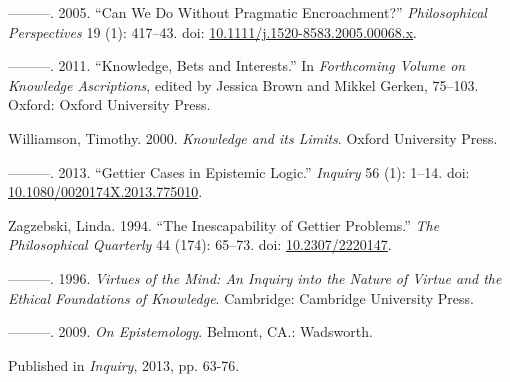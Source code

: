 \documentclass[
  10pt,
  letterpaper,
  DIV=11,
  numbers=noendperiod,
  twoside]{scrartcl}
\newlength{\cslhangindent}
\newenvironment{CSLReferences}[2] %
 {\begin{list}{}{%
  \setlength{\itemindent}{0pt}
  \setlength{\leftmargin}{0pt}
  \setlength{\parsep}{0pt}
  \ifodd #1
   \setlength{\leftmargin}{\cslhangindent}
   \setlength{\itemindent}{-1\cslhangindent}
  \fi
  \setlength{\itemsep}{#2\baselineskip}}}
 {\end{list}}
\begin{document}
\begin{CSLReferences}{1}{0}
---------. 2005. {``{Can We Do Without Pragmatic Encroachment?}''}
\emph{Philosophical Perspectives} 19 (1): 417--43. doi:
\href{https://doi.org/10.1111/j.1520-8583.2005.00068.x}{10.1111/j.1520-8583.2005.00068.x}.

---------. 2011. {``Knowledge, Bets and Interests.''} In
\emph{Forthcoming Volume on Knowledge Ascriptions}, edited by Jessica
Brown and Mikkel Gerken, 75--103. Oxford: Oxford University Press.

Williamson, Timothy. 2000. \emph{{Knowledge and its Limits}}. Oxford
University Press.

---------. 2013. {``Gettier Cases in Epistemic Logic.''} \emph{Inquiry}
56 (1): 1--14. doi:
\href{https://doi.org/10.1080/0020174X.2013.775010}{10.1080/0020174X.2013.775010}.

Zagzebski, Linda. 1994. {``The Inescapability of Gettier Problems.''}
\emph{The Philosophical Quarterly} 44 (174): 65--73. doi:
\href{https://doi.org/10.2307/2220147}{10.2307/2220147}.

---------. 1996. \emph{Virtues of the Mind: An Inquiry into the Nature
of Virtue and the Ethical Foundations of Knowledge}. Cambridge:
Cambridge University Press.

---------. 2009. \emph{On Epistemology}. Belmont, CA.: Wadsworth.

\end{CSLReferences}



\noindent Published in\emph{
Inquiry}, 2013, pp. 63-76.
\end{document}
